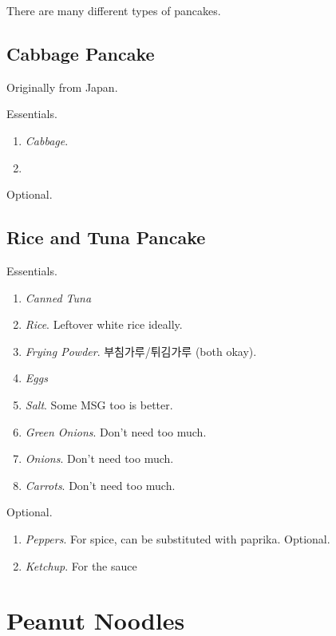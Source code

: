 \documentclass{article}
\begin{document}
  There are many different types of pancakes. 

  \subsection{Cabbage Pancake} 

    Originally from Japan. 
  
    \begin{definition}
      Essentials. 
      \begin{enumerate}
        \item \textit{Cabbage}. 
        \item 
      \end{enumerate}

      Optional. 
    \end{definition}

  \subsection{Rice and Tuna Pancake} 

    \begin{definition}
      Essentials. 
      \begin{enumerate}
        \item \textit{Canned Tuna} 
        \item \textit{Rice}. Leftover white rice ideally. 
        \item \textit{Frying Powder}. 부침가루/튀김가루 (both okay). 
        \item \textit{Eggs}
        \item \textit{Salt}. Some MSG too is better. 
        \item \textit{Green Onions}. Don't need too much. 
        \item \textit{Onions}. Don't need too much. 
        \item \textit{Carrots}. Don't need too much. 
      \end{enumerate}
      Optional. 
      \begin{enumerate}
        \item \textit{Peppers}. For spice, can be substituted with paprika. Optional. 
        \item \textit{Ketchup}. For the sauce
      \end{enumerate}
    \end{definition}

\section{Peanut Noodles}
\end{document}
